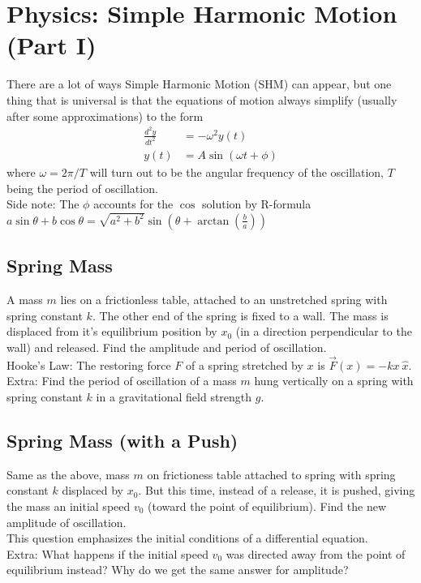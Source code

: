 \documentclass{article}
\begin{document}
\section{Physics: Simple Harmonic Motion (Part I)}
There are a lot of ways Simple Harmonic Motion (SHM) can appear, but one thing that is universal is that the equations of motion always simplify (usually after some approximations) to the form 
\begin{align}
    \frac{d^2 y}{dt^2} &= -\omega^2 y(t) \\
    y(t) &= A \sin (\omega t + \phi)
\end{align}
where $\omega = 2\pi/T$ will turn out to be the angular frequency of the oscillation, $T$ being the period of oscillation. \\[10pt]
Side note: The $\phi$ accounts for the $\cos$ solution by R-formula $a \sin \theta + b \cos \theta = \sqrt{a^2 + b^2} \sin(\theta + \arctan \left(\frac{b}{a}\right))$


\subsection{Spring Mass}
A mass $m$ lies on a frictionless table, attached to an unstretched spring with spring constant $k$. The other end of the spring is fixed to a wall. The mass is displaced from it's equilibrium position by $x_0$ (in a direction perpendicular to the wall) and released. Find the amplitude and period of oscillation.\\[10pt]
Hooke's Law: The restoring force $F$ of a spring stretched by $x$ is $\vec{F}(x) = -kx\ \hat{x}$.\\[10pt]
Extra: Find the period of oscillation of a mass $m$ hung vertically on a spring with spring constant $k$ in a gravitational field strength $g$.

\subsection{Spring Mass (with a Push)}
Same as the above, mass $m$ on frictioness table attached to spring with spring constant $k$ displaced by $x_0$. But this time, instead of a release, it is pushed, giving the mass an initial speed $v_0$ (toward the point of equilibrium). Find the new amplitude of oscillation.\\[10pt]
This question emphasizes the initial conditions of a differential equation.\\[10pt]
Extra: What happens if the initial speed $v_0$ was directed away from the point of equilibrium instead? Why do we get the same answer for amplitude? 
\end{document}
